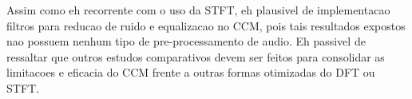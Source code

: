 \documentclass{article}
\begin{document}
	Assim como eh recorrente com o uso da STFT, eh plausivel de implementacao filtros para reducao de ruido e equalizacao no CCM, pois tais resultados expostos nao possuem nenhum tipo de pre-processamento de audio. Eh passivel de ressaltar que outros estudos comparativos devem ser feitos para consolidar as limitacoes e eficacia do CCM frente a outras formas otimizadas do DFT ou STFT.		






%
%
%
%
\end{document}
